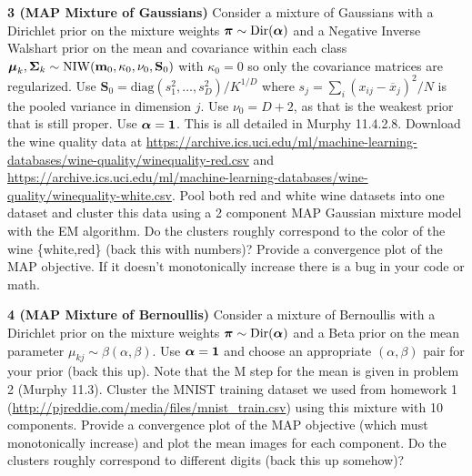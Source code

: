 \documentclass[12pt,letterpaper,fleqn]{hmcpset}
\begin{document}
\textbf{3 (MAP Mixture of Gaussians)} Consider a mixture of Gaussians with a Dirichlet prior on the
mixture weights $\hbox{\boldmath$\pi$} \sim \mathrm{Dir}(\hbox{\boldmath$\alpha$})$ and a Negative Inverse Walshart prior on the
mean and covariance within each class
$\hbox{\boldmath$\mu$}_k,\hbox{\boldmath$\Sigma$}_k \sim \mathrm{NIW}(\mathbf{m}_0,\kappa_0,\nu_0,\mathbf{S}_0)$ with $\kappa_0=0$ so
only the covariance matrices are regularized. Use $\mathbf{S}_0 = \mathrm{diag}(s_1^2,\dots,s_D^2)/K^{1/D}$
where $s_j = \sum_i(x_{ij} - \overline{x}_j)^2/N$ is the pooled variance in dimension $j$. Use $\nu_0 = D + 2$,
as that is the weakest prior that is still proper. Use $\hbox{\boldmath$\alpha$} = {\bf 1}$. This is all detailed in Murphy 11.4.2.8. Download the
wine quality data at \url{https://archive.ics.uci.edu/ml/machine-learning-databases/wine-quality/winequality-red.csv}
and \url{https://archive.ics.uci.edu/ml/machine-learning-databases/wine-quality/winequality-white.csv}. Pool both
red and white wine datasets into one dataset and cluster this data using a 2 component MAP Gaussian mixture model
with the EM algorithm. Do the clusters roughly correspond to the color of the wine \{white,red\} (back this with
numbers)? Provide a convergence plot of the MAP objective. If it doesn't monotonically increase there is a bug
in your code or math.

\textbf{4 (MAP Mixture of Bernoullis)} Consider a mixture of Bernoullis with a Dirichlet prior on the mixture
weights $\hbox{\boldmath$\pi$} \sim \mathrm{Dir}(\hbox{\boldmath$\alpha$})$ and a Beta prior on the mean parameter $\mu_{kj} \sim \beta(\alpha,\beta)$.
Use $\hbox{\boldmath$\alpha$}={\bf 1}$ and choose an appropriate $(\alpha,\beta)$ pair for your prior (back this up).
Note that the M step for the mean is given in problem 2 (Murphy 11.3). Cluster the MNIST training dataset we used
from homework 1 (\url{http://pjreddie.com/media/files/mnist_train.csv}) using this mixture with 10 components.
Provide a convergence plot of the MAP objective
(which must monotonically increase) and plot the mean images for each component. Do the clusters roughly correspond to
different digits (back this up somehow)?
\end{document}
